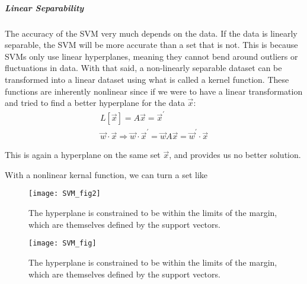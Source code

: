 \subparagraph{Linear Separability}
The accuracy of the SVM very much depends on the data. If the data is linearly separable, the SVM will be more accurate than a set that is not. This is because SVMs only use linear hyperplanes, meaning they cannot bend around outliers or fluctuations in data. With that said, a non-linearly separable dataset can be transformed into a linear dataset using what is called a kernel function. These functions are inherently nonlinear since if we were to have a linear transformation and tried to find a better hyperplane for the data $\vec{x}$:
\begin{equation}
\begin{gathered}
	L[\vec{x}] = A\vec{x} = \vec{x}^{'} \\
	\vec{w}\cdot \vec{x} \Rightarrow \vec{w} \cdot \vec{x}^{'} = \vec{w}A\vec{x} = \vec{w}^{'}\cdot\vec{x} 
\end{gathered}
\end{equation}

This is again a hyperplane on the same set $\vec{x}$, and provides us no better solution.

With a nonlinear kernal function, we can turn a set like 

\begin{figure*}[!htb]
	\texttt{[image: SVM\_fig2]}
	\centering
	\caption{The hyperplane is constrained to be within the limits of the margin, which are themselves defined by the support vectors. \cite{matlab}}
	\label{fig:SVM_fig2}
\end{figure*}

\begin{figure}[!htb]
	\texttt{[image: SVM\_fig]}
	\centering
	\caption{The hyperplane is constrained to be within the limits of the margin, which are themselves defined by the support vectors. \cite{matlab}}
	\label{fig:SVM_fig2}
\end{figure}


